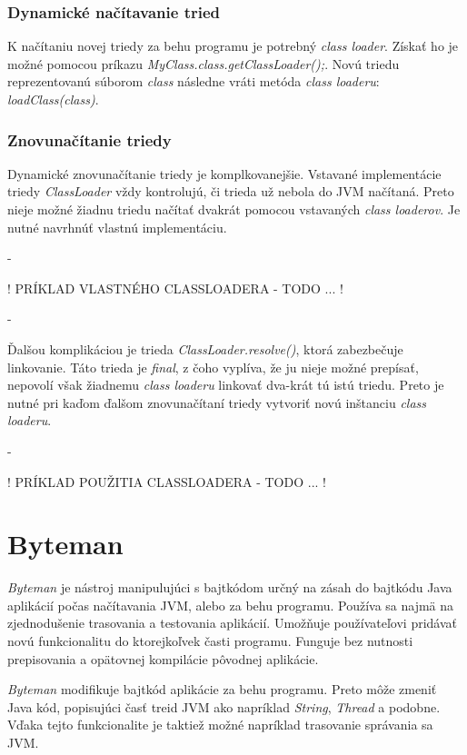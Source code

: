 \documentclass[11pt,final,oneside]{fithesis}
\begin{document}
\subsection{Dynamické načítavanie tried}
K načítaniu novej triedy za behu programu je potrebný \textit{class loader}.
Získať ho je možné pomocou príkazu \textit{MyClass.class.getClassLoader();}.
Novú triedu reprezentovanú súborom \textit{class} následne vráti metóda
\textit{class loaderu}: \textit{loadClass(class)}.

\subsection{Znovunačítanie triedy}
Dynamické znovunačítanie triedy je komplkovanejšie. Vstavané implementácie 
triedy \textit{ClassLoader} vždy kontrolujú, či trieda už nebola do JVM
načítaná. Preto nieje možné žiadnu triedu načítať dvakrát pomocou vstavaných
\textit{class loaderov}. Je nutné navrhnúť vlastnú implementáciu.

-

! PRÍKLAD VLASTNÉHO CLASSLOADERA - TODO ... !

-

Ďalšou komplikáciou je trieda \textit{ClassLoader.resolve()},
ktorá zabezbečuje linkovanie. Táto trieda je \textit{final}, z čoho vyplíva, že 
ju nieje možné prepísať, nepovolí však žiadnemu \textit{class loaderu} linkovať
dva-krát tú istú triedu. Preto je nutné pri kaďom ďalšom znovunačítaní triedy
vytvoriť novú inštanciu \textit{class loaderu}. %

-

! PRÍKLAD POUŽITIA CLASSLOADERA - TODO ... !

\chapter{Byteman}
\label{chap:Byteman}
\textit{Byteman} je nástroj manipulujúci s bajtkódom určný na zásah do bajtkódu Java aplikácií počas načítavania JVM, alebo za behu programu. 
Používa sa najmä na zjednodušenie trasovania a testovania aplikácií. Umožňuje 
používateľovi pridávať novú funkcionalitu do ktorejkoľvek časti programu.
Funguje bez nutnosti prepisovania a opätovnej kompilácie pôvodnej aplikácie.

\textit{Byteman} modifikuje bajtkód aplikácie za behu programu. Preto môže  
zmeniť Java kód, popisujúci časť treid JVM ako napríklad \textit{String},
\textit{Thread} a podobne. Vďaka tejto funkcionalite je taktiež možné
napríklad trasovanie správania sa JVM.
\end{document}
